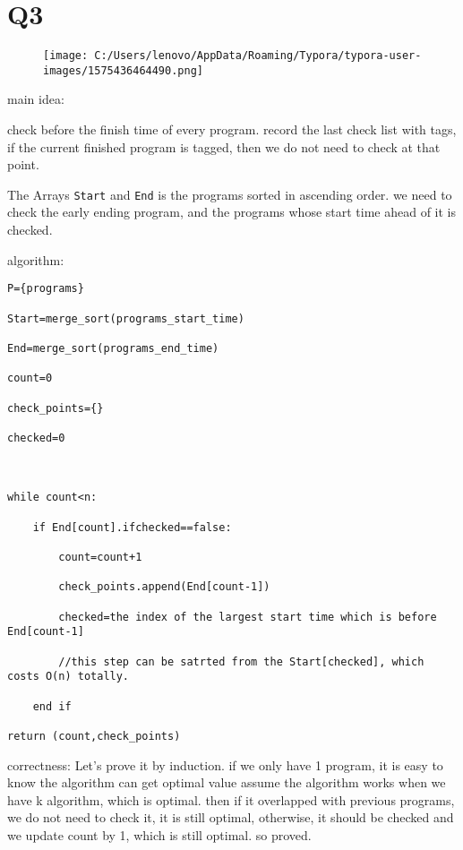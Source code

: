 \documentclass[]{article}
\begin{document}
\section{Q3}\label{header-n23}

\begin{figure}
\centering
\texttt{[image: C:/Users/lenovo/AppData/Roaming/Typora/typora-user-images/1575436464490.png]}
\caption{}
\end{figure}

main idea:

check before the finish time of every program. record the last check
list with tags, if the current finished program is tagged, then we do
not need to check at that point.

The Arrays \texttt{Start} and \texttt{End} is the programs sorted in
ascending order. we need to check the early ending program, and the
programs whose start time ahead of it is checked.

algorithm:

\begin{verbatim}
P={programs}

Start=merge_sort(programs_start_time)

End=merge_sort(programs_end_time) 

count=0

check_points={}

checked=0



while count<n:

	if End[count].ifchecked==false:

		count=count+1

		check_points.append(End[count-1])

		checked=the index of the largest start time which is before End[count-1]

		//this step can be satrted from the Start[checked], which costs O(n) totally.

	end if 

return (count,check_points)

\end{verbatim}

correctness: Let's prove it by induction. if we only have 1 program, it
is easy to know the algorithm can get optimal value assume the algorithm
works when we have k algorithm, which is optimal. then if it overlapped
with previous programs, we do not need to check it, it is still optimal,
otherwise, it should be checked and we update count by 1, which is still
optimal. so proved.
\end{document}
